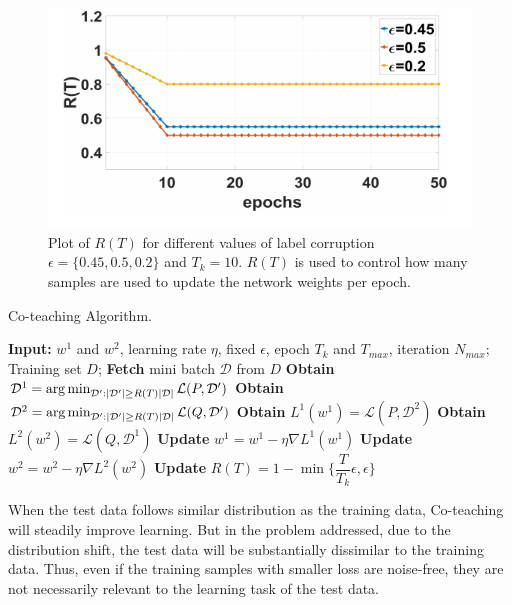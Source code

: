 \begin{figure}[ht]
            \centering
            \includegraphics[scale = 0.5]{plot_R(T).png}
            \caption{Plot of $R(T)$ for different values of label corruption $\epsilon =\{0.45,0.5,0.2\}$ and $T_k = 10$. $R(T)$ is used \cite{coteaching} to control how many samples are used to update the network weights per epoch.}
\label{fig:R(T)}
\end{figure}
\begin{algorithm}[H]
	\caption{Co-teaching Algorithm.} 
	\begin{algorithmic}[1]
	    \State \textbf{Input:} $w^1$ and $w^2$, learning rate $\eta$, fixed $\epsilon$, epoch $T_k$ and $T_{max}$, iteration $N_{max}$;
		    \State Training set ${D}$;
				    \State \textbf{Fetch} mini batch $\mathcal{D}$ from ${D}$
				    \State \textbf{Obtain} $\mathcal{D}^1 = \operatorname*{arg\,min}_{\mathcal{D}':|\mathcal{D}'|\geq R(T)|\mathcal{D}|} \mathcal{L}(P, \mathcal{D}')$   
				    \State \textbf{Obtain} $\mathcal{D}^2 = \operatorname*{arg\,min}_{\mathcal{D}':|\mathcal{D}'|\geq R(T)|\mathcal{D}|} \mathcal{L}(Q, \mathcal{D}')$
				    \State \textbf{Obtain} $L^1(w^1) = \mathcal{L}(P,\mathcal{D}^2)$ 
				    \State \textbf{Obtain} $L^2(w^2) = \mathcal{L}(Q,\mathcal{D}^1)$ 
				    \State \textbf{Update} $w^1 = w^1 - \eta \nabla L^1(w^1)$
				    \State \textbf{Update} $w^2 = w^2 - \eta \nabla L^2(w^2)$
			    \EndFor
			 \State \textbf{Update} $R(T)= 1- \min\bigg\{\dfrac{T}{T_k}\epsilon, \epsilon\bigg\}$
		\EndFor
	\end{algorithmic} 
\end{algorithm}


When the test data follows similar distribution as the training data, Co-teaching will steadily improve learning. 
But in the problem addressed, due to the distribution shift, the test data will be substantially dissimilar to the training data. 
Thus, even if the training samples with smaller loss are noise-free, they are not necessarily relevant to the learning task of the test data.